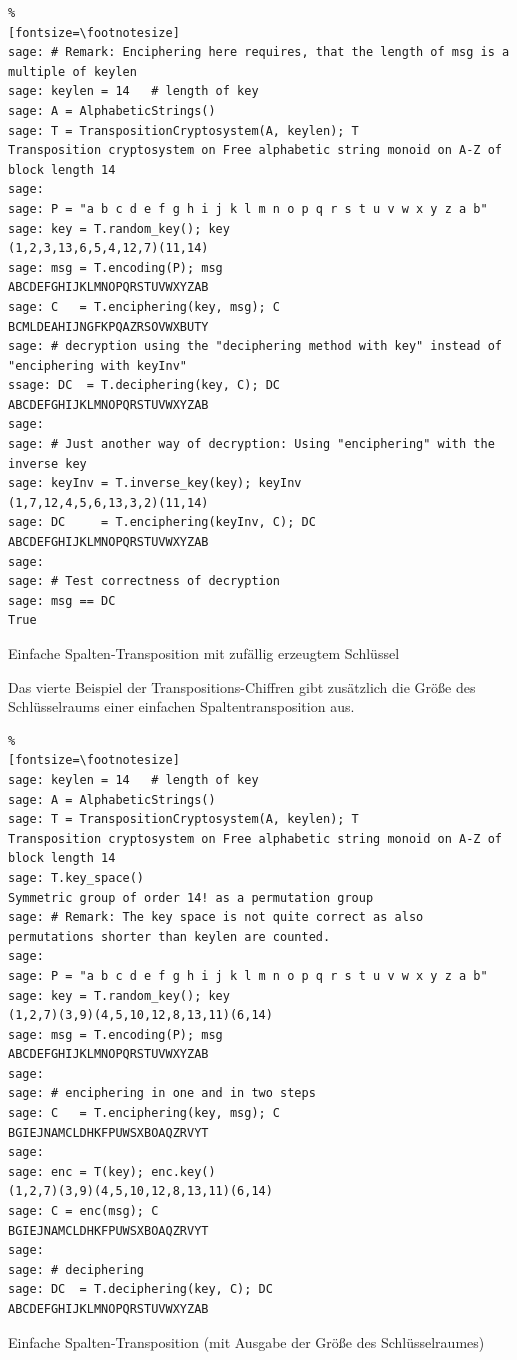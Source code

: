 \begin{refsegment}
\begin{sagecode}
\begin{Verbatim}%
[fontsize=\footnotesize]
sage: # Remark: Enciphering here requires, that the length of msg is a multiple of keylen
sage: keylen = 14   # length of key
sage: A = AlphabeticStrings()
sage: T = TranspositionCryptosystem(A, keylen); T
Transposition cryptosystem on Free alphabetic string monoid on A-Z of block length 14
sage:
sage: P = "a b c d e f g h i j k l m n o p q r s t u v w x y z a b"
sage: key = T.random_key(); key
(1,2,3,13,6,5,4,12,7)(11,14)
sage: msg = T.encoding(P); msg
ABCDEFGHIJKLMNOPQRSTUVWXYZAB
sage: C   = T.enciphering(key, msg); C
BCMLDEAHIJNGFKPQAZRSOVWXBUTY
sage: # decryption using the "deciphering method with key" instead of "enciphering with keyInv"
ssage: DC  = T.deciphering(key, C); DC
ABCDEFGHIJKLMNOPQRSTUVWXYZAB
sage:
sage: # Just another way of decryption: Using "enciphering" with the inverse key
sage: keyInv = T.inverse_key(key); keyInv
(1,7,12,4,5,6,13,3,2)(11,14)
sage: DC     = T.enciphering(keyInv, C); DC
ABCDEFGHIJKLMNOPQRSTUVWXYZAB
sage:
sage: # Test correctness of decryption
sage: msg == DC
True
\end{Verbatim}
\caption{Einfache Spalten-Transposition mit zufällig erzeugtem Schlüssel}
\end{sagecode}


Das vierte Beispiel der Transpositions-Chiffren gibt zusätzlich die Größe des Schlüsselraums
einer einfachen Spaltentransposition aus.

\begin{sagecode}
\begin{Verbatim}%
[fontsize=\footnotesize]
sage: keylen = 14   # length of key
sage: A = AlphabeticStrings()
sage: T = TranspositionCryptosystem(A, keylen); T
Transposition cryptosystem on Free alphabetic string monoid on A-Z of block length 14
sage: T.key_space()
Symmetric group of order 14! as a permutation group
sage: # Remark: The key space is not quite correct as also permutations shorter than keylen are counted.
sage:
sage: P = "a b c d e f g h i j k l m n o p q r s t u v w x y z a b"
sage: key = T.random_key(); key
(1,2,7)(3,9)(4,5,10,12,8,13,11)(6,14)
sage: msg = T.encoding(P); msg
ABCDEFGHIJKLMNOPQRSTUVWXYZAB
sage:
sage: # enciphering in one and in two steps
sage: C   = T.enciphering(key, msg); C
BGIEJNAMCLDHKFPUWSXBOAQZRVYT
sage:
sage: enc = T(key); enc.key()
(1,2,7)(3,9)(4,5,10,12,8,13,11)(6,14)
sage: C = enc(msg); C
BGIEJNAMCLDHKFPUWSXBOAQZRVYT
sage:
sage: # deciphering
sage: DC  = T.deciphering(key, C); DC
ABCDEFGHIJKLMNOPQRSTUVWXYZAB
\end{Verbatim}
\caption{Einfache Spalten-Transposition (mit Ausgabe der Größe des Schlüsselraumes)}
\end{sagecode}




\end{refsegment}
